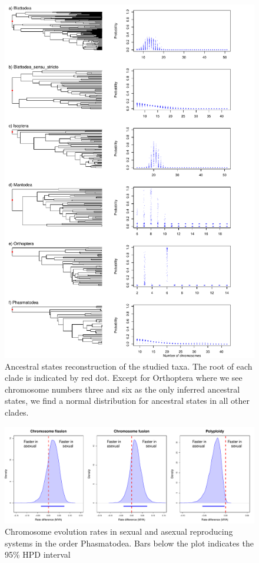 \newpage
\begin{figure}
\centering \includegraphics[width=.7\textwidth]{figures/asr_plot.pdf}
\caption{Ancestral states reconstruction of the studied taxa. The root of each clade is indicated by red dot. Except for Orthoptera where we see chromosome numbers three and six as the only inferred ancestral states, we find a normal distribution for ancestral states in all other clades.}
\label{fig:asr}
\end{figure}

\newpage
\begin{figure}
\centering \includegraphics[width=.7\textwidth]{figures/phasmatodea_sex_asex_plot.pdf}
\caption{Chromosome evolution rates in sexual and asexual reproducing systems in the order Phasmatodea. Bars below the plot indicates the 95\% HPD interval}
\label{fig:phas.plot}
\end{figure}


